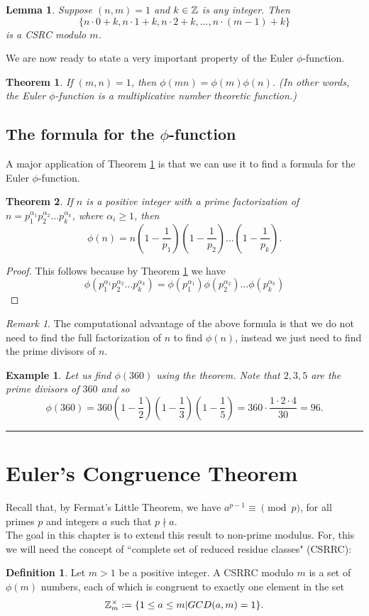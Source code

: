 \documentclass[12pt]{article}
\theoremstyle{plain}
\newtheorem{lemma}{Lemma}
\newtheorem{example}{Example}
\newtheorem{theorem}{Theorem}
\theoremstyle{definition}
\newtheorem{definition}{Definition}
\theoremstyle{remark}
\newtheorem{remark}{Remark}
\begin{document}
\bigskip
\noindent
\begin{lemma}
Suppose $(n,m)=1$ and $k\in \mathbb{Z}$ is any integer. Then
$$\{n\cdot 0+k, n\cdot 1+k, n\cdot 2+k, \dots, n\cdot(m-1)+k\}$$
is a CSRC modulo $m$.
\end{lemma}

\bigskip
\noindent
We are now ready to state a very important property of the Euler $\phi$-function.
\begin{theorem}\label{phi}
If $(m,n) = 1$, then $\phi(mn)=\phi(m)\phi(n)$. (In other words, the Euler $\phi$-function is a multiplicative number theoretic function.)
\end{theorem}

\subsection{The formula for the $\phi$-function}
A major application of Theorem \ref{phi} is that we can use it to find a formula for the Euler $\phi$-function.
\begin{theorem}\label{phi-formula}
If $n$ is a positive integer with a prime factorization of  $n=p_1^{\alpha_1}p_2^{\alpha_2} \dots p_k^{\alpha_k}$, where $\alpha_i\geq 1$, then
$$\phi(n) = n\left(1-\frac{1}{p_1}\right)\left(1-\frac{1}{p_2}\right)\dots \left(1-\frac{1}{p_k}\right).$$
\end{theorem}
\begin{proof}
This follows because by Theorem \ref{phi} we have
$$\phi(p_1^{\alpha_1}p_2^{\alpha_2} \dots p_k^{\alpha_k}) = \phi(p_1^{\alpha_1})\phi(p_2^{\alpha_2}) \dots \phi(p_k^{\alpha_k})$$
\end{proof}

\begin{remark}
The computational advantage of the above formula is that we do not need to find the full factorization of $n$ to find $\phi(n)$, instead we just need to find the prime divisors of $n$.
\end{remark}

\bigskip
\noindent
\begin{example}
Let us find $\phi(360)$ using the theorem. Note that $2,3, 5$ are the prime divisors of $360$ and so
$$\phi(360) = 360\left (1-\frac{1}{2}\right ) \left (1-\frac{1}{3}\right )\left (1-\frac{1}{5}\right ) = 360\cdot \frac{1\cdot 2\cdot 4}{30}=96.$$
\end{example}

\bigskip
\hrule
\section{Euler's Congruence Theorem}
Recall that, by Fermat's Little Theorem, we have $a^{p-1} \equiv \pmod{p}$, for all primes $p$ and integers $a$ such that $p\nmid a$.
\\
The goal in this chapter is to extend this result to non-prime modulus.
For, this we will need the concept of ``complete set of reduced residue classes" (CSRRC):
\begin{definition}
Let $m>1$ be a positive integer. A CSRRC modulo $m$ is a set of $\phi(m)$ numbers, each of which is congruent to exactly one element in the set
$$\mathbb{Z}_m^{\times}:= \{1\leq a\leq m| GCD(a,m)=1\}.$$
\end{definition}
\end{document}
